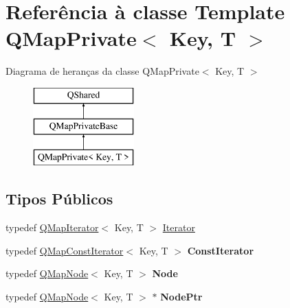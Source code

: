 \hypertarget{class_q_map_private}{\section{Referência à classe Template Q\-Map\-Private$<$ Key, T $>$}
\label{class_q_map_private}
}
Diagrama de heranças da classe Q\-Map\-Private$<$ Key, T $>$\begin{figure}[H]
\begin{center}
\leavevmode
\includegraphics[height=3.000000cm]{class_q_map_private}
\end{center}
\end{figure}
\subsection*{Tipos Públicos}
\begin{DoxyCompactItemize}
\item 
typedef \hyperlink{class_q_map_iterator}{Q\-Map\-Iterator}$<$ Key, T $>$ \hyperlink{class_q_map_private_a8037b7e85b3b6dc9ae44eccdf67eccb6}{Iterator}
\item 
\hypertarget{class_q_map_private_ab549c7b3fba54c1d480524f4dba47517}{typedef \hyperlink{class_q_map_const_iterator}{Q\-Map\-Const\-Iterator}$<$ Key, T $>$ {\bfseries Const\-Iterator}}\label{class_q_map_private_ab549c7b3fba54c1d480524f4dba47517}

\item 
\hypertarget{class_q_map_private_a47480163ef89c6d6a1390a92d0bc9b2b}{typedef \hyperlink{struct_q_map_node}{Q\-Map\-Node}$<$ Key, T $>$ {\bfseries Node}}\label{class_q_map_private_a47480163ef89c6d6a1390a92d0bc9b2b}

\item 
\hypertarget{class_q_map_private_a858d62f3ddcb2369ebca2ea416500741}{typedef \hyperlink{struct_q_map_node}{Q\-Map\-Node}$<$ Key, T $>$ $\ast$ {\bfseries Node\-Ptr}}\label{class_q_map_private_a858d62f3ddcb2369ebca2ea416500741}

\end{DoxyCompactItemize}
